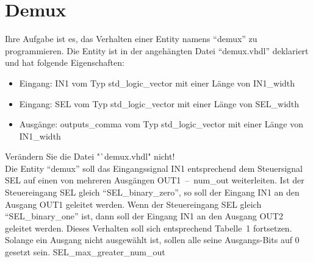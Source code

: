 \documentclass[a4paper,12pt]{article}
\begin{document}
\pagestyle{empty}
\setlength{\parindent}{0em}
\section*{\noindent Demux }
Ihre Aufgabe ist es, das Verhalten einer Entity  namens "`demux"' zu programmieren. Die Entity ist in der angeh\"angten Datei "`demux.vhdl"' deklariert und hat folgende Eigenschaften:

\begin{itemize}
	\item Eingang: IN1 vom Typ std\_logic\_vector mit einer L\"ange von {{IN1_width}}
	\item Eingang: SEL vom Typ std\_logic\_vector mit einer L\"ange von {{SEL_width}}
	\item Ausg\"ange: {{outputs_comma}} vom Typ std\_logic\_vector mit einer L\"ange von {{IN1_width}}
\end{itemize}

\begin{center}
\end{center}

Ver\"andern Sie die Datei "`demux.vhdl" nicht!\\

Die Entity "`demux"' soll das Eingangssignal IN1 entsprechend dem Steuersignal SEL auf einen von mehreren Ausg\"angen \mbox{OUT1 -- {{num_out}}} weiterleiten. Ist der Steuereingang SEL gleich "`{{SEL_binary_zero}}"', so soll der Eingang IN1 an den Ausgang OUT1 geleitet werden. Wenn der Steuereingang SEL gleich "`{{SEL_binary_one}}"' ist, dann soll der Eingang IN1 an den Ausgang OUT2 geleitet werden. Dieses Verhalten soll sich entsprechend Tabelle~1 fortsetzen. Solange ein Ausgang nicht ausgew\"ahlt ist, sollen alle seine Ausgangs-Bits auf 0 gesetzt sein. {{SEL_max_greater_num_out}}
\end{document}
